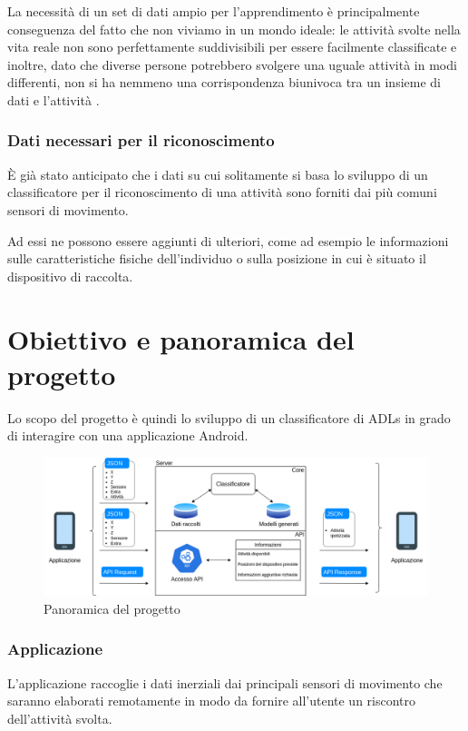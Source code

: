 La necessità di un set di dati ampio per l'apprendimento è principalmente conseguenza del fatto che non viviamo in un mondo ideale: 
le attività svolte nella vita reale non sono perfettamente suddivisibili per essere facilmente classificate e inoltre, dato che diverse persone
potrebbero svolgere una uguale attività in modi differenti, non si ha nemmeno una corrispondenza biunivoca tra un insieme di dati e l'attività \cite{framework_long_term_data_har}.

\subsubsection{Dati necessari per il riconoscimento}
È già stato anticipato che i dati su cui solitamente si basa lo sviluppo di un classificatore per il riconoscimento di una attività sono forniti dai 
più comuni sensori di movimento.

Ad essi ne possono essere aggiunti di ulteriori, come ad esempio le informazioni sulle caratteristiche fisiche
dell'individuo o sulla posizione in cui è situato il dispositivo di raccolta.

\section{Obiettivo e panoramica del progetto}
Lo scopo del progetto è quindi lo sviluppo di un classificatore di ADLs in grado di interagire con una applicazione
Android.

\begin{figure}[H]
    \centering
    \includegraphics[scale = 0.41]{assets/images/overview.png}
    \caption{Panoramica del progetto}
    \label{fig:overview}
\end{figure}

\subsubsection{Applicazione}
L'applicazione raccoglie i dati inerziali dai principali sensori di movimento che saranno elaborati 
remotamente in modo da fornire all'utente un riscontro dell'attività svolta.

